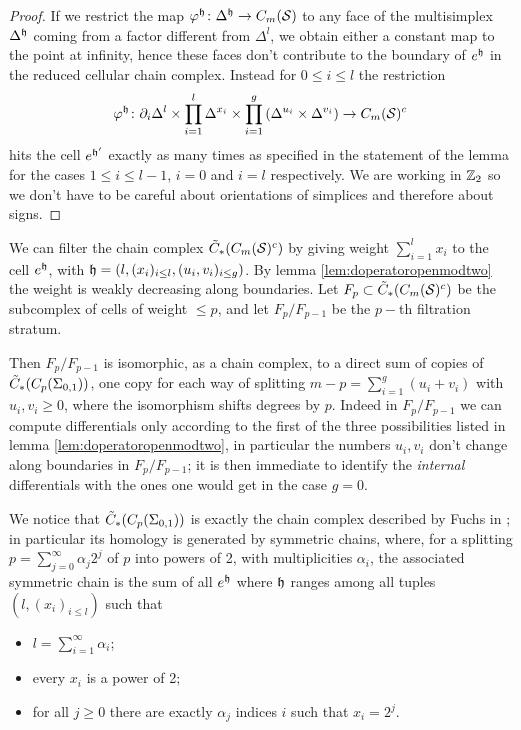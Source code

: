 \begin{proof}
 If we restrict the map $\varphi^{\mathfrak{h}}\colon\Delta^{\mathfrak{h}}\to C_m(\mathcal{S})$ to any face of the multisimplex
 $\Delta^{\mathfrak{h}}$ coming from a factor different from $\Delta^l$,
 we obtain either a constant map to the point at infinity, hence these faces don't contribute
 to the boundary of $e^{\mathfrak{h}}$ in the reduced cellular chain complex. Instead for $0\leq i\leq l$ the restriction
 \[
  \varphi^{\mathfrak{h}}\colon\partial_i\Delta^l\times\prod_{i=1}^l\Delta^{x_i}\times\prod_{i=1}^g\left(\Delta^{u_i}\times\Delta^{v_i}\right)\to C_m(\mathcal{S})^c
 \]
 hits the cell $e^{\mathfrak{h}'}$ exactly as many times as specified in the statement of the lemma for the cases $1\leq i\leq l-1$,
 $i=0$ and $i=l$ respectively. We are working in $\mathbb{Z}_2$ so we don't have to be careful about orientations of simplices
 and therefore about signs.
\end{proof}

We can filter the chain complex $\tilde{C}_*(C_m(\mathcal{S})^c)$ by giving weight $\sum_{i=1}^lx_i$ to
the cell $e^{\mathfrak{h}}$, with $\mathfrak{h}=(l,(x_i)_{i\leq l},(u_i,v_i)_{i\leq g})$. By lemma \ref{lem:doperatoropenmodtwo}
the weight is weakly decreasing along boundaries. Let $F_p\subset\tilde{C}_*(C_m(\mathcal{S})^c)$ be the subcomplex of cells
of weight $\leq p$, and let $F_p/F_{p-1}$ be the $p-$th filtration stratum.

Then $F_p/F_{p-1}$ is isomorphic, as a chain complex, to a direct sum of copies of $\tilde{C}_*(C_p(\Sigma_{0,1}))$,
one copy for each way of splitting $m-p=\sum_{i=1}^g (u_i+v_i)$ with $u_i,v_i\geq 0$, where the isomorphism
shifts degrees by $p$. Indeed in $F_p/F_{p-1}$ we can compute differentials only according to the first
of the three possibilities listed in lemma \ref{lem:doperatoropenmodtwo}, in particular the numbers $u_i,v_i$
don't change along boundaries in $F_p/F_{p-1}$; it is then immediate to identify the \emph{internal} differentials
with the ones one would get in the case $g=0$.

We notice that $\tilde{C}_*(C_p(\Sigma_{0,1}))$ is exactly the chain complex described by Fuchs in
\cite{Fuchs:CohomBraidModtwo}; in particular its homology is generated by symmetric chains,
where, for a splitting $p=\sum_{j=0}^{\infty}\alpha_j2^j$ of $p$ into powers of 2, with multiplicities $\alpha_i$,
the associated symmetric chain is the sum of all $e^{\mathfrak{h}}$ where $\mathfrak{h}$ ranges among all tuples
$(l,(x_i)_{i\leq l})$ such that
\begin{itemize}
 \item $l=\sum_{i=1}^{\infty}\alpha_i$;
 \item every $x_i$ is a power of 2;
 \item for all $j\geq 0$ there are exactly $\alpha_j$ indices $i$ such that $x_i=2^j$.
\end{itemize}

